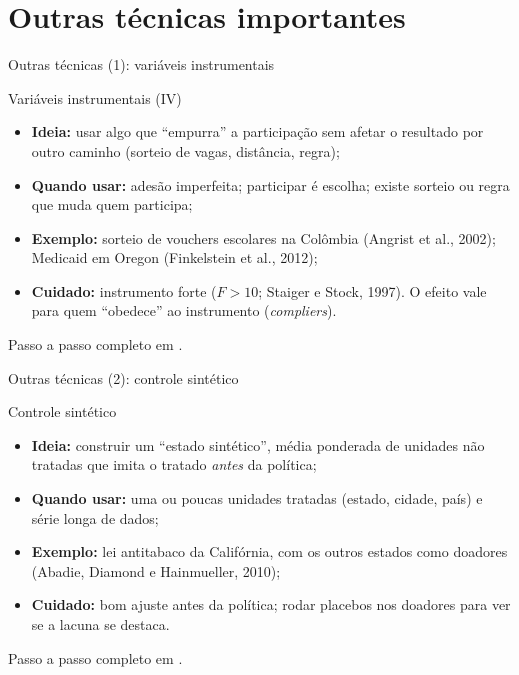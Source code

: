 \section[Outras]{Outras técnicas importantes}

\begin{frame}{Outras técnicas (1): variáveis instrumentais}
  \begin{block}{Variáveis instrumentais (IV)}
    \small
    \begin{itemize}\setlength{\itemsep}{2pt}
      \item \textbf{Ideia:} usar algo que ``empurra'' a participação sem afetar o resultado por outro caminho (sorteio de vagas, distância, regra);
      \item \textbf{Quando usar:} adesão imperfeita; participar é escolha; existe sorteio ou regra que muda quem participa;
      \item \textbf{Exemplo:} sorteio de vouchers escolares na Colômbia (Angrist et al., 2002); Medicaid em Oregon (Finkelstein et al., 2012);
      \item \textbf{Cuidado:} instrumento forte ($F>10$; Staiger e Stock, 1997). O efeito vale para quem ``obedece'' ao instrumento (\emph{compliers}).
    \end{itemize}
  \end{block}
  \scriptsize Passo a passo completo em .
\end{frame}

\begin{frame}{Outras técnicas (2): controle sintético}
  \begin{block}{Controle sintético}
    \small
    \begin{itemize}\setlength{\itemsep}{2pt}
      \item \textbf{Ideia:} construir um ``estado sintético'', média ponderada de unidades não tratadas que imita o tratado \emph{antes} da política;
      \item \textbf{Quando usar:} uma ou poucas unidades tratadas (estado, cidade, país) e série longa de dados;
      \item \textbf{Exemplo:} lei antitabaco da Califórnia, com os outros estados como doadores (Abadie, Diamond e Hainmueller, 2010);
      \item \textbf{Cuidado:} bom ajuste antes da política; rodar placebos nos doadores para ver se a lacuna se destaca.
    \end{itemize}
  \end{block}
  \scriptsize Passo a passo completo em .
\end{frame}

